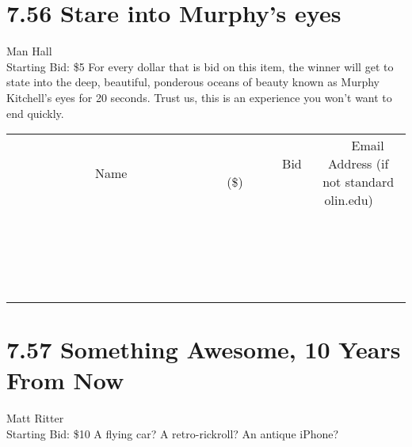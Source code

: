 \documentclass[11pt]{article}
\begin{document}
\section*{7.56 Stare into Murphy's eyes}
Man Hall
\\
Starting Bid: \$5
\newline
For every dollar that is bid on this item, the winner will get to state into the deep, beautiful, ponderous oceans of beauty known as Murphy Kitchell's eyes for 20 seconds. Trust us, this is an experience you won't want to end quickly.
\\[3ex]
\begin{tabular}{c c c}
~~~~~~~~~~~~~Name~~~~~~~~~~~~~ & ~~~~~~~~~Bid (\$)~~~~~~~~~  & ~~~Email Address (if not standard olin.edu)~~~\\
 & & \\
\hline
 & & \\
\hline
 & & \\
\hline
 & & \\
\hline
 & & \\
\hline
 & & \\
\hline
 & & \\
\hline
 & & \\
\hline
 & & \\
\hline
 & & \\
\hline
 & & \\
\hline
 & & \\
\hline
 & & \\
\hline
 & & \\
\hline
 & & \\
\hline
 & & \\
\hline
 & & \\
\hline
 & & \\
\hline
 & & \\
\hline
\end{tabular}
\newpage
\section*{7.57  Something Awesome, 10 Years From Now}
Matt Ritter
\\
Starting Bid: \$10
\newline
A flying car? A retro-rickroll? An antique iPhone?
\end{document}
